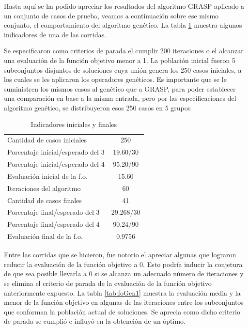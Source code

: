 \documentclass[a4paper,openright,11pt,oneside]{book}
\begin{document}
	Hasta aquí se ha podido apreciar los resultados del algoritmo GRASP aplicado a un conjunto de casos de prueba, veamos a continuación sobre ese mismo conjunto, el comportamiento del algoritmo genético. La tabla \ref{tab:IndicadoresGen1} muestra algunos indicadores de una de las corridas.
	
	Se especificaron como criterios de parada el cumplir 200 iteraciones o el alcanzar una evaluación de la función objetivo menor a 1. La población inicial fueron 5 subconjuntos disjuntos de soluciones cuya unión genera los 250 casos iniciales, a los cuales se les aplicaron los operadores genéticos. Es importante que se le suministren los mismos casos al genético que a GRASP, para poder establecer una comparación en base a la misma entrada, pero por las especificaciones del algoritmo genético, se distribuyeron esos 250 casos en 5 grupos
	
	\begin{table}[h]
		\begin{center}
			\begin{tabular}{| l | c |} \hline
				Cantidad de casos iniciales & 250 \\
				Porcentaje inicial/esperado del 3 & 19.60/30 \\
				Porcentaje inicial/esperado del 4 & 95.20/90 \\
				Evaluación inicial de la f.o. & 15.60 \\ \hline
				Iteraciones del algoritmo & 60 \\ \hline
				Cantidad de casos finales & 41 \\
				Porcentaje final/esperado del 3 & 29.268/30 \\
				Porcentaje final/esperado del 4 & 90.24/90 \\
				Evaluación final de la f.o. & 0.9756 \\ \hline
			\end{tabular}
			\caption{Indicadores iniciales y finales}
			\label{tab:IndicadoresGen1}
		\end{center}
	\end{table}

	Entre las corridas que se hicieron, fue notorio el apreciar algunas que lograron reducir la evaluación de la función objetivo a 0. Esto podría inducir la conjetura de que sea posible llevarla a 0 si se alcanza un adecuado número de iteraciones y se elimina el criterio de parada de la evaluación de la función objetivo anteriormente expuesto. La tabla \ref{tab:foGen1} muestra la evaluación media y la menor de la función objetivo en algunas de las iteraciones entre los subconjuntos que conforman la población actual de soluciones. Se aprecia como dicho criterio de parada se cumplió e influyó en la obtención de un óptimo.
\end{document}

